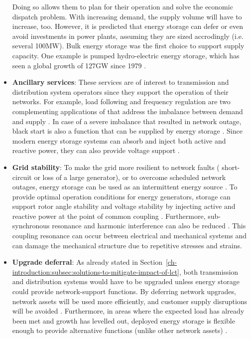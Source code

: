 \begin{itemize}
Doing so allows them to plan for their operation and solve the economic dispatch problem.
With increasing demand, the supply volume will have to increase, too.
However, it is predicted that energy storage can defer or even avoid investments in power plants, assuming they are sized accrodingly (i.e. several 100MW)\cite{Dobie1998}.
Bulk energy storage was the first choice to support supply capacity.
One example is pumped hydro-electric energy storage, which has seen a global growth of 127GW since 1979 \cite{Rehman2015, Barbour2015, Barbour2016}.
\item
\textbf{Ancillary services}: These services are of interest to transmission and distribution system operators since they support the operation of their networks.
For example, load following and frequency regulation are two complementing applications of that address the imbalance between demand and supply \cite{Bevrani2011}.
In case of a severe imbalance that resulted in network outage, black start is also a function that can be supplied by energy storage \cite{Cole1995, Kashem2007}.
Since modern energy storage systems can absorb and inject both active and reactive power, they can also provide voltage support \cite{Kulkarni2005}.
\item
\textbf{Grid stability}: To make the grid more resilient to network faults ( short-circuit or loss of a large generator), or to overcome scheduled network outages, energy storage can be used as an intermittent energy source \cite{Kundur1993}.
To provide optimal operation conditions for energy generators, storage can support rotor angle stability and voltage stability by injecting active and reactive power at the point of common coupling \cite{Chakraborty2012, Kolluri2002}.
Furthermore, sub-synchronous resonance and harmonic interference can also be reduced \cite{Wang1994}.
This coupling resonance can occur between electrical and mechanical systems and can damage the mechanical structure due to repetitive stresses and strains.
\item
\textbf{Upgrade deferral}: As already stated in Section~\ref{ch-introduction:subsec:solutions-to-mitigate-impact-of-lct}, both transmission and distribution systems would have to be upgraded unless energy storage could provide network-support functions.
By deferring network upgrades, network assets will be used more efficiently, and customer supply disruptions will be avoided \cite{Sayer2007, Eyer2010a}.
Furthermore, in areas where the expected load has already been met and growth has levelled out, deployed energy storage is flexible enough to provide alternative functions (unlike other network assets) \cite{Huff2013}.

\end{itemize}

